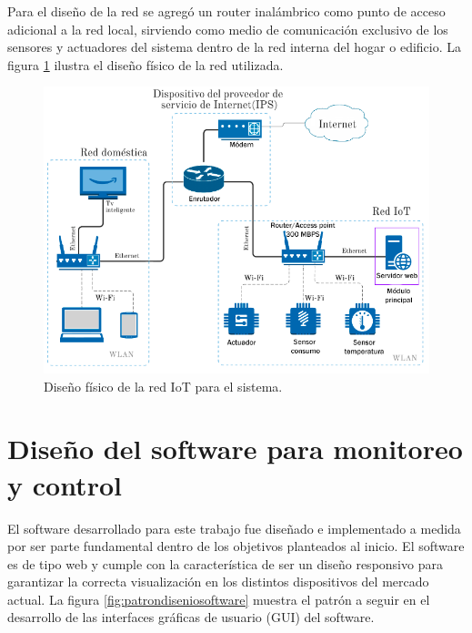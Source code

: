 Para el diseño de la red se agregó un router inalámbrico como punto de acceso adicional a la red local, sirviendo como medio de comunicación exclusivo de los sensores y actuadores del sistema dentro de la red interna del hogar o edificio. La figura \ref{fig:diagramared} ilustra el diseño físico de la red utilizada.
\begin{figure}[htpb]
\centering 
\includegraphics[width=1.0\textwidth]{./Figures/rediot2.png}
\caption{Diseño físico de la red IoT para el sistema.}
\label{fig:diagramared}
\end{figure}
\section{Diseño del software para monitoreo y control}

El software desarrollado para este trabajo fue diseñado e implementado a medida por ser parte fundamental dentro de los objetivos planteados al inicio. El software es de tipo web y cumple con la característica de ser un diseño responsivo para garantizar la correcta visualización en los distintos dispositivos del mercado actual. La figura \ref{fig:patrondiseniosoftware} muestra el patrón a seguir en el desarrollo de las interfaces gráficas de usuario (GUI) del software.

